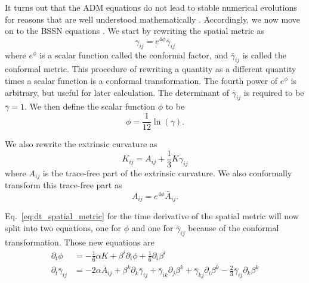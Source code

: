 \begin{bibunit}[unsrtnat]
It turns out that the ADM equations do not lead to stable numerical evolutions
for reasons that are well understood mathematically
\cite{Kidder:2001tz,Baumgarte:2010ndz}. Accordingly, we now move on to the BSSN
equations \cite{Shibata:1995we,Baumgarte:1998te}. We start by rewriting the
spatial metric as
\begin{equation}
   \gamma_{ij} = e^{4\phi}\bar{\gamma}_{ij}
\end{equation}
where $e^\phi$ is a scalar function called the conformal factor, and
$\bar{\gamma}_{ij}$ is called the conformal metric. This procedure of rewriting
a quantity as a different quantity times a scalar function is a conformal
transformation. The fourth power of $e^\phi$ is arbitrary, but useful for later
calculation. The determinant of $\bar{\gamma}_{ij}$ is required to be
$\bar{\gamma}=1$. We then define the scalar function $\phi$ to be
\begin{equation}
   \phi = \frac{1}{12}\ln(\gamma) .
\end{equation}

We also rewrite the extrinsic curvature as
\begin{equation}
   K_{ij} = A_{ij} + \frac{1}{3}K\gamma_{ij}
\end{equation}
where $A_{ij}$ is the trace-free part of the extrinsic curvature. We also
conformally transform this trace-free part as
\begin{equation}
   A_{ij} = e^{4\phi}\bar{A}_{ij} .
\end{equation}

Eq.~\ref{eq:dt_spatial_metric} for the time derivative of the spatial
metric will now split into two equations, one for $\phi$ and one for
$\bar{\gamma}_{ij}$ because of the conformal transformation. Those new equations
are
\begin{align}
   \partial_t \phi &= -\frac{1}{6}\alpha K + \beta^i\partial_i\phi + \frac{1}{6}\partial_i\beta^i 
   \label{eq:dt_conformal_factor}\\
   \partial_t\bar{\gamma}_{ij} &= -2\alpha\bar{A}_{ij} + \beta^k\partial_k\bar{\gamma}_{ij}
   +\bar{\gamma}_{ik}\partial_j\beta^k + \bar{\gamma}_{kj}\partial_i\beta^k 
   -\frac{2}{3}\bar{\gamma}_{ij}\partial_k\beta^k\label{eq:dt_conformal_spatial_metric}
\end{align}


\end{bibunit}
